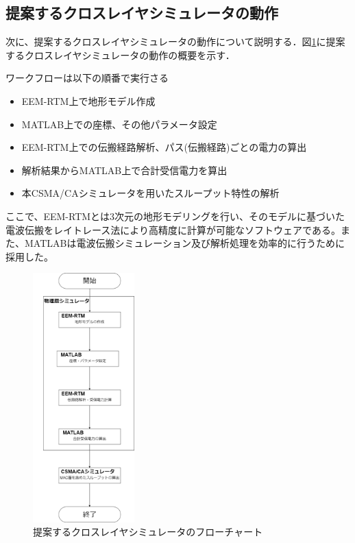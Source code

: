 \documentclass[a4paper,10pt]{ltjsarticle}
\begin{document}
\clearpage
\subsection{提案するクロスレイヤシミュレータの動作}

次に、提案するクロスレイヤシミュレータの動作について説明する．図\ref{fig:cross_simu_flow}に提案するクロスレイヤシミュレータの動作の概要を示す．

ワークフローは以下の順番で実行さる

\begin{itemize}
  \item EEM-RTM上で地形モデル作成
  \item MATLAB上での座標、その他パラメータ設定
  \item EEM-RTM上での伝搬経路解析、パス(伝搬経路)ごとの電力の算出
  \item 解析結果からMATLAB上で合計受信電力を算出
  \item 本CSMA/CAシミュレータを用いたスループット特性の解析
\end{itemize}

ここで、EEM-RTMとは3次元の地形モデリングを行い、そのモデルに基づいた電波伝搬をレイトレース法により高精度に計算が可能なソフトウェアである。また、MATLABは電波伝搬シミュレーション及び解析処理を効率的に行うために採用した。



\begin{figure}[H]
  \centering
  \includegraphics[width=0.35\textwidth]{./assets/cross_simu_flow.drawio.png}
  \caption{提案するクロスレイヤシミュレータのフローチャート}
  \label{fig:cross_simu_flow}
\end{figure}
\end{document}
